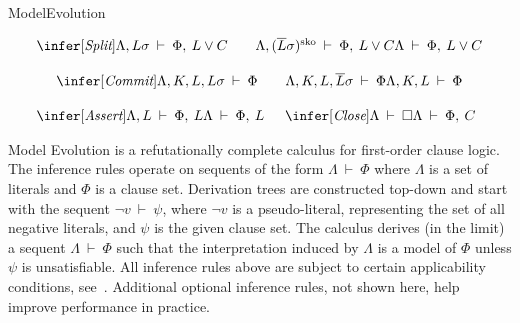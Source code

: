 \begin{entry}{ModelEvolution}



\begin{calculus}


\[
  \begin{array}{cc}
\multicolumn{2}{c}{
\infer[\textit{Split}]
{\Lambda, L\sigma\: \vdash\: \Phi,\: L \lor C\qquad \Lambda, (\overline{L}\sigma)^{\mathrm{sko}}\: \vdash\:  \Phi,\: L \lor C}
{\Lambda\: \vdash\:  \Phi,\: L \lor C}
}
    \\[3ex]
\multicolumn{2}{c}{
\infer[\textit{Commit}]
{{\Lambda, K, L, L\sigma}\:\vdash\:{\Phi} \qquad {\Lambda, K, L, \overline{L}\sigma}\:\vdash\:{\Phi}}
{{\Lambda, K, L}\:\vdash\:{\Phi}}
} \\[3ex]
\infer[\textit{Assert}]
{{\Lambda, L}\:\vdash\:{\Phi,\: L}}
{{\Lambda}\:\vdash\:{\Phi,\: L}}
&
\infer[\textit{Close}]
{{\Lambda}\:\vdash\:{\Box}}
{{\Lambda}\:\vdash\:{\Phi,\: C}}
  \end{array}
\]
\end{calculus}


\begin{clarifications}
Model Evolution is a refutationally complete calculus for first-order clause
logic. The inference rules operate on sequents of the form $\Lambda\:\vdash\:\Phi$ where $\Lambda$ is a
set of literals and $\Phi$ is a clause set. Derivation trees are constructed top-down
and start with the sequent $\neg v\:\vdash\:\psi$, where $\neg v$ is a pseudo-literal, representing
the set of all negative literals, and $\psi$ is the given clause set. The calculus
derives (in the limit) a sequent $\Lambda\:\vdash\:\Phi$ such that the interpretation induced by $\Lambda$ is a model
of $\Phi$ unless $\psi$ is unsatisfiable. All inference rules above are subject
to certain applicability conditions,
see~\cite{Baumgartner:Tinelli:ModelEvolutionCalculus:CADE:2003}.
Additional optional inference rules, not shown here, help improve performance in practice.
\end{clarifications}


\end{entry}
